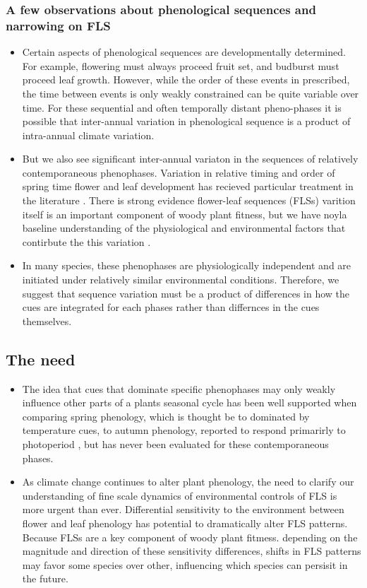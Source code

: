 \documentclass{article}\usepackage[]{graphicx}\usepackage[]{color}
\begin{document}
\subsubsection*{A few observations about phenological sequences and narrowing on FLS}
\begin{itemize}
\item Certain aspects of phenological sequences are developmentally determined. For example, flowering must always proceed fruit set, and budburst must proceed leaf growth.
However, while the order of these events in prescribed, the time between events is only weakly constrained \citep{} can be quite variable over time. For these sequential and often temporally distant pheno-phases it is possible that inter-annual variation in phenological sequence is a product of intra-annual climate variation. %
\item But we also see significant inter-annual variaton in the sequences of relatively contemporaneous phenophases. Variation in relative timing and order of spring time flower and leaf development has recieved particular treatment in the literature \citep{}.  There is strong evidence flower-leaf sequences (FLSs) varition itself is an important component of woody plant fitness, but we have noyla baseline understanding of the physiological and environmental factors that contirbute the this variation \citep{}.
\item In many species, these phenophases are physiologically independent and are initiated under relatively similar environmental conditions. Therefore, we suggest that sequence variation must be a product of differences in how the cues are integrated for each phases rather than differnces in the cues themselves.
\end{itemize}

\subsection*{The need}
\begin{itemize}
\item The idea that cues that dominate specific phenophases may only weakly influence other parts of a plants seasonal cycle has been well supported when comparing 
spring phenology, which is thought be to dominated by temperature cues, to autumn phenology, reported to respond primarirly to photoperiod \citep{}, but has never been evaluated for these contemporaneous phases.
\item As climate change continues to alter plant phenology, the need to clarify our understanding of fine scale dynamics of environmental controls of FLS is more urgent than ever. Differential sensitivity to the environment between flower and leaf phenology has potential to dramatically alter FLS patterns. Because FLSs are a key component of woody plant fitmess. depending on the magnitude and direction of these sensitivity differences, shifts in FLS patterns may favor some species over other, influencing which species can persisit in the future.
\end{itemize}
\end{document}
